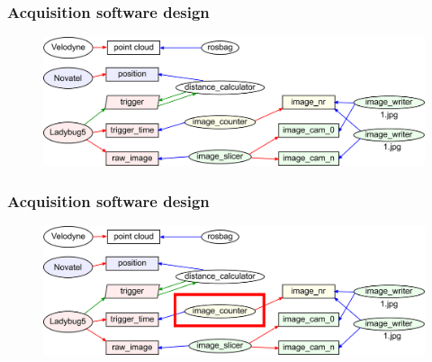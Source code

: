 \documentclass[aspectratio=169]{beamer}
\begin{document}
  \begin{frame}
   \frametitle{Acquisition software design}
    
    \begin{figure}[h]
      \centering
      \includegraphics[width=13.5cm]{./Abbildungen/ROSImageCapturing.png}
      \label{abb:ROSImageCapturing}
    \end{figure}

  \end{frame}
  
  \begin{frame}
   \frametitle{Acquisition software design}
    
    \begin{figure}[h]
      \centering
      \includegraphics[width=13.5cm]{./Abbildungen/ROSImageCapturingFrame.png}
      \label{abb:ROSImageCapturingFrame}
    \end{figure}

  \end{frame}
\end{document}
